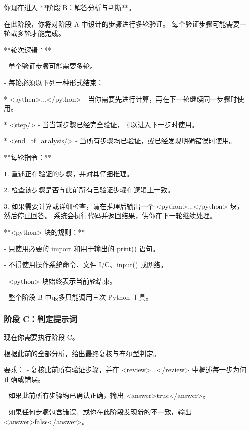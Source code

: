 \documentclass[11pt]{article}
\begin{document}
\begin{promptbox}
你现在进入 **阶段 B：解答分析与判断**。

在此阶段，你将对阶段 A 中设计的步骤进行多轮验证。
每个验证步骤可能需要一轮或多轮才能完成。

**轮次逻辑：**

- 单个验证步骤可能需要多轮。

- 每轮必须以下列一种形式结束：

  * <python>...</python> - 当你需要先进行计算，再在下一轮继续同一步骤时使用。
  
  * <step/> - 当当前步骤已经完全验证，可以进入下一步时使用。
  
  * <end\_of\_analysis/> - 当所有步骤均已验证，或已经发现明确错误时使用。

**每轮指令：**

1. 重述正在验证的步骤，并对其仔细推理。

2. 检查该步骤是否与此前所有已验证步骤在逻辑上一致。

3. 如果需要计算或详细检查，请在推理后输出一个 <python>...</python> 块，然后停止回答。
   系统会执行代码并返回结果，供你在下一轮继续处理。

**<python> 块的规则：**

- 只使用必要的 import 和用于输出的 print() 语句。

- 不得使用操作系统命令、文件 I/O、input() 或网络。

- <python> 块始终表示当前轮结束。

- 整个阶段 B 中最多只能调用三次 Python 工具。

\end{promptbox}

\subsubsection{阶段 C：判定提示词}
\label{sec:appendix_review_prompt}

\begin{promptbox}
现在你需要执行阶段 C。

根据此前的全部分析，给出最终复核与布尔型判定。

要求：
- 复核此前所有验证步骤，并在 <review>...</review> 中概述每一步为何正确或错误。

- 如果此前所有步骤均已确认正确，输出 <answer>true</answer>。

- 如果任何步骤包含错误，或你在此阶段发现新的不一致，输出 <answer>false</answer>。
\end{promptbox}
\end{document}
